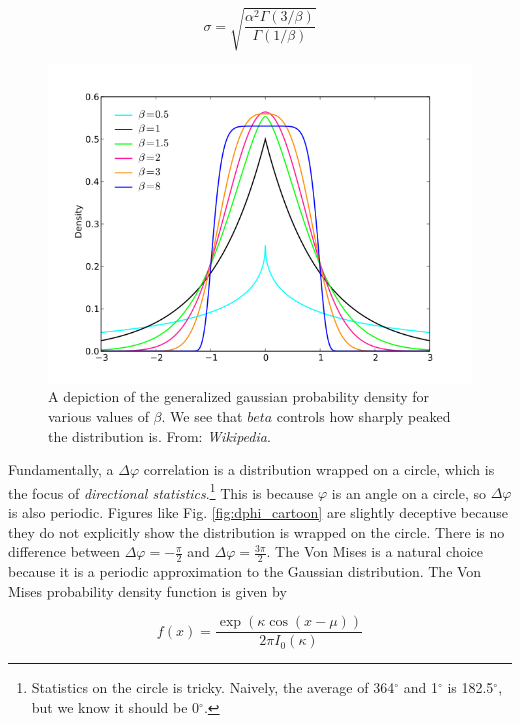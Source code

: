 \documentclass[../main.tex]{subfiles}
\begin{document}
\begin{equation}
    \sigma = \sqrt{\frac{\alpha^2 \Gamma(3/\beta)}{\Gamma(1/\beta)}}
    \label{eq:gengaussigma}
\end{equation}

\begin{figure}
    \centering
    \includegraphics[scale=0.5]{analysis/figs/gengaus.png}
    \caption{A depiction of the generalized gaussian probability density for various values of $\beta$. We see that $
    beta$ controls how sharply peaked the distribution is. From: \textit{Wikipedia}.}
    \label{fig:gengaus}
\end{figure}

Fundamentally, a $\Delta\varphi$ correlation is a distribution wrapped on a circle, which is the focus of \textit{directional statistics}.\footnote{Statistics on the circle is tricky.   Naively, the average of 364$^{\circ}$ and 1$^{\circ}$ is 182.5$^{\circ}$, but we know it should be 0$^{\circ}$.} This is because $\varphi$ is an angle on a circle, so $\Delta \varphi$ is also periodic. Figures like Fig. \ref{fig:dphi_cartoon} are slightly deceptive because they do not explicitly show the distribution is wrapped on the circle. There is no difference between $\Delta \varphi = -\frac{\pi}{2}$ and $\Delta \varphi = \frac{3\pi}{2}$. The Von Mises is a natural choice because it is a periodic approximation to the Gaussian distribution. The Von Mises probability density function is given by

\begin{equation}
    f(x) = \frac{\exp{(\kappa \cos{(x-\mu)})}}{2\pi I_0(\kappa)}
\end{equation}
\end{document}
